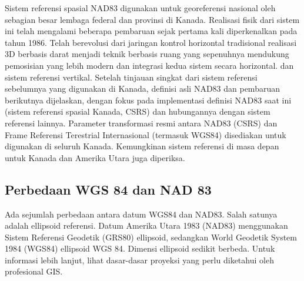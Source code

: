 Sistem referensi spasial NAD83 digunakan untuk georeferensi nasional oleh sebagian besar lembaga federal dan provinsi di Kanada. Realisasi fisik dari sistem ini telah mengalami beberapa pembaruan sejak pertama kali diperkenalkan pada tahun 1986. Telah berevolusi dari jaringan kontrol horizontal tradisional realisasi 3D berbasis darat menjadi teknik berbasis ruang yang sepenuhnya mendukung pemosisian yang lebih modern dan integrasi kedua sistem secara horizontal. dan sistem referensi vertikal. Setelah tinjauan singkat dari sistem referensi sebelumnya yang digunakan di Kanada, definisi asli NAD83 dan pembaruan berikutnya dijelaskan, dengan fokus pada implementasi definisi NAD83 saat ini (sistem referensi spasial Kanada, CSRS) dan hubungannya dengan sistem referensi lainnya. Parameter transformasi resmi antara NAD83 (CSRS) dan Frame Referensi Terestrial Internasional (termasuk WGS84) disediakan untuk digunakan di seluruh Kanada. Kemungkinan sistem referensi di masa depan untuk Kanada dan Amerika Utara juga diperiksa.

\subsection{Perbedaan WGS 84 dan NAD 83}
Ada sejumlah perbedaan antara datum WGS84 dan NAD83. Salah satunya adalah ellipsoid referensi. Datum Amerika Utara 1983 (NAD83) menggunakan Sistem Referensi Geodetik (GRS80) ellipsoid, sedangkan World Geodetik System 1984 (WGS84) ellipsoid WGS 84. Dimensi ellipsoid sedikit berbeda. Untuk informasi lebih lanjut, lihat dasar-dasar proyeksi yang perlu diketahui oleh profesional GIS.

